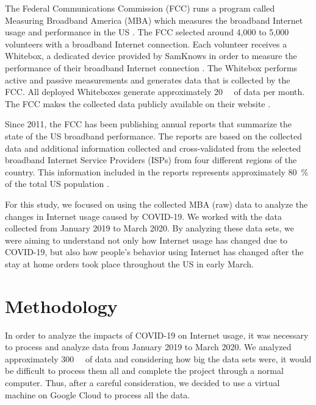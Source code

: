 \documentclass[conference,10pt]{IEEEtran}
\begin{document}

The Federal Communications Commission (FCC) runs a program called Measuring Broadband America (MBA) which measures the broadband Internet usage and performance in the US \cite{mba}. The FCC selected around 4,000 to 5,000 volunteers with a broadband Internet connection. Each volunteer receives a Whitebox, a dedicated device provided by SamKnows in order to measure the performance of their broadband Internet connection \cite{sam}. The Whitebox performs active and passive measurements and generates data that is collected by the FCC. All deployed Whiteboxes generate approximately \SI{20}{\giga\byte} of data per month. The FCC makes the collected data publicly available on their website \cite{data}.

Since 2011, the FCC has been publishing annual reports that summarize the state of the US broadband performance. The reports are based on the collected data and additional information collected and cross-validated from the selected broadband Internet Service Providers (ISPs) from four different regions of the country. This information included in the reports represents approximately \SI{80}{\percent} of the total US population \cite{mba-studies}.

For this study, we focused on using the collected MBA (raw) data to analyze the changes in Internet usage caused by COVID-19. We worked with the data collected from January 2019 to March 2020. By analyzing these data sets, we were aiming to understand not only how Internet usage has changed due to COVID-19, but also how people's behavior using  Internet has changed after the stay at home orders took place throughout the US in early March.

\section{Methodology}
\label{sec:methodology}

In order to analyze the impacts of COVID-19 on Internet usage, it was necessary to process and analyze data from January 2019 to March 2020. We analyzed approximately \SI{300}{\giga\byte} of data and considering how big the data sets were, it would be difficult to process them all and complete the project through a normal computer. Thus, after a careful consideration, we decided to use a virtual machine on Google Cloud to process all the data.
\end{document}
